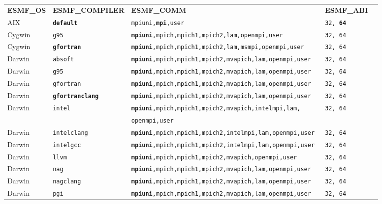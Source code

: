 \begin{longtable}{lllll}
  {\bfseries\footnotesize ESMF\_OS} &{\bfseries\footnotesize ESMF\_COMPILER} & {\bfseries\footnotesize ESMF\_COMM} & {\bfseries\footnotesize ESMF\_ABI} \\

AIX     &\tt {\bf default}        &\footnotesize \tt mpiuni,{\bf mpi},user      &\tt 32, {\bf 64} \\
Cygwin  &\tt g95                  &\footnotesize \tt {\bf mpiuni},mpich,mpich1,mpich2,lam,openmpi,user &\tt 32, 64 \\
Cygwin  &\tt {\bf gfortran}       &\footnotesize \tt {\bf mpiuni},mpich,mpich1,mpich2,lam,msmpi,openmpi,user &\tt 32, 64 \\
Darwin  &\tt absoft               &\footnotesize \tt {\bf mpiuni},mpich,mpich1,mpich2,mvapich,lam,openmpi,user &\tt 32, 64 \\
Darwin  &\tt g95                  &\footnotesize \tt {\bf mpiuni},mpich,mpich1,mpich2,mvapich,lam,openmpi,user &\tt 32, 64 \\
Darwin  &\tt gfortran             &\footnotesize \tt {\bf mpiuni},mpich,mpich1,mpich2,mvapich,lam,openmpi,user &\tt 32, 64 \\
Darwin  &\tt {\bf gfortranclang}  &\footnotesize \tt {\bf mpiuni},mpich,mpich1,mpich2,mvapich,lam,openmpi,user &\tt 32, 64 \\
Darwin  &\tt intel                &\footnotesize \tt {\bf mpiuni},mpich,mpich1,mpich2,mvapich,intelmpi,lam, &\tt 32, 64 \\
        &                         &\footnotesize \tt openmpi,user &  \\
Darwin  &\tt intelclang           &\footnotesize \tt {\bf mpiuni},mpich,mpich1,mpich2,intelmpi,lam,openmpi,user &\tt 32, 64 \\
Darwin  &\tt intelgcc             &\footnotesize \tt {\bf mpiuni},mpich,mpich1,mpich2,intelmpi,lam,openmpi,user &\tt 32, 64 \\
Darwin  &\tt llvm                 &\footnotesize \tt {\bf mpiuni},mpich,mpich1,mpich2,mvapich,openmpi,user &\tt 32, 64 \\
Darwin  &\tt nag                  &\footnotesize \tt {\bf mpiuni},mpich,mpich1,mpich2,mvapich,lam,openmpi,user &\tt 32, 64 \\
Darwin  &\tt nagclang             &\footnotesize \tt {\bf mpiuni},mpich,mpich1,mpich2,mvapich,lam,openmpi,user &\tt 32, 64 \\
Darwin  &\tt pgi                  &\footnotesize \tt {\bf mpiuni},mpich,mpich1,mpich2,mvapich,lam,openmpi,user &\tt 32, 64 \\

\end{longtable}
